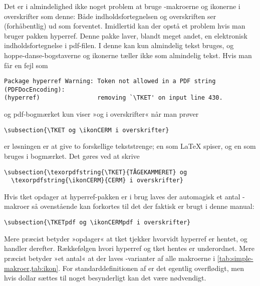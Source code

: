 \documentclass[a4paper,article,oneside,danish]{memoir}
\newcommand{\pakkenavn}[1]{\textsf{#1}}
\newcommand{\ptket}{\pakkenavn{tket}\xspace}
\newcommand*{\optionname}[1]{\textcolor{option}{#1}}
\begin{document}
Det er i almindelighed ikke noget problem at bruge -makroerne
og ikonerne i overskrifter som denne: Både indholdsfortegnelsen og
overskriften ser (forhåbentlig) ud som forventet. Imidlertid kan der
opstå et problem hvis man bruger pakken \pakkenavn{hyperref}. Denne
pakke laver, blandt meget andet, en elektronisk indholdsfortegnelse i
pdf-filen. I denne kan kun almindelig tekst bruges, og
hoppe-danse-bogstaverne og ikonerne tæller ikke som almindelig
tekst. Hvis man får en fejl som
\begin{verbatim}
Package hyperref Warning: Token not allowed in a PDF string (PDFDocEncoding):
(hyperref)                removing `\TKET' on input line 430.
\end{verbatim}
og pdf-bogmærket kun viser »og i overskrifter« når man prøver
\begin{verbatim}
\subsection{\TKET og \ikonCERM i overskrifter}
\end{verbatim}
er løsningen er at give to
forskellige tekststrenge; en som \LaTeX{} spiser, og en som bruges i
bogmærket. Det gøres ved at skrive
\begin{verbatim}
\subsection{\texorpdfstring{\TKET}{TÅGEKAMMERET} og
  \texorpdfstring{\ikonCERM}{CERM} i overskrifter}
\end{verbatim}

Hvis \ptket opdager at \pakkenavn{hyperref}-pakken er i brug laves der
automagisk et antal -makroer så ovenstående kan forkortes
til det der faktisk er brugt i denne manual:
\begin{verbatim}
\subsection{\TKETpdf og \ikonCERMpdf i overskrifter}
\end{verbatim}
Mere præcist betyder »opdager« at \ptket tjekker 
hvorvidt \pakkenavn{hyperref} er hentet, og handler
derefter. Rækkefølgen hvori \pakkenavn{hyperref} og \ptket hentes er
underordnet. Mere præcist betyder »et antal« at der laves
-varianter af alle makroerne i \vref{tab:simple-makroer,tab:ikon}.
For standarddefinitionen af  er det
egentlig overflødigt, men hvis \optionname{dollar} sættes til noget
besynderligt kan det være nødvendigt.
\end{document}
